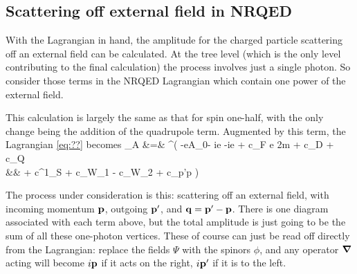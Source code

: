 \subsection{Scattering off external field in NRQED}
With the Lagrangian in hand, the amplitude for the charged particle scattering off an external field can be calculated.  At the tree level (which is the only level contributing to the final calculation) the process involves just a single photon.  So consider those terms in the NRQED Lagrangian which contain one power of the external field.  

This calculation is largely the same as that for spin one-half, with the only change being the addition of the quadrupole term.  Augmented by this term, the Lagrangian \eqref{eq:??} becomes 
\small
\beqa
{}_A &=& \Psi^\dagger (  -eA_0- ie   -ie  
		+ c_F e  {2m}   	
		+ c_D 	
		+ c_Q 	
	\\&&	+ c^{1}_S 
		+ c_{W_1} 	
		- c_{W_2} 
		+ c_{p'p} \frac{ e [ (\v{S} \smalldot \v{\grad}) (\v{B} \smalldot \v{\grad}) + (\v{B} \smalldot \v{\grad})(\v{S} \smalldot \v{\grad}) }{8m^3} \big )\Psi
\eeqa
\normalsize


The process under consideration is this: scattering off an external field, with incoming momentum $\mathbf{p}$, outgoing $\mathbf{p'}$, and $\mathbf{q} = \mathbf{p'} - \mathbf{p}$.  There is one diagram associated with each term above, but the total amplitude is just going to be the sum of all these one-photon vertices.  These of course can just be read off directly from the Lagrangian: replace the fields $\Psi$ with the spinors $\phi$, and any operator $\grad$ acting will become $i\mathbf{p}$ if it acts on the right, $i\mathbf{p'}$ if it is to the left.

